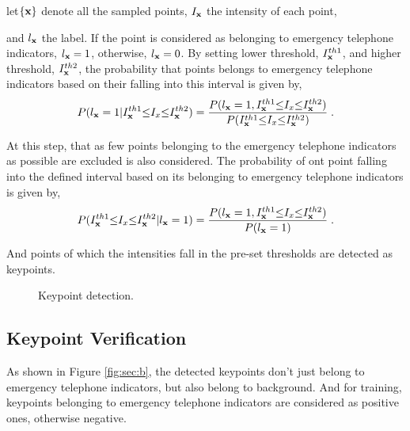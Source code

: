 let$\{\bf{x}\}$ denote all the sampled points, $I_{\bf{x}}$ the intensity of each point, 
and $l_{\bf{x}}$ the label. If the point is considered as belonging to emergency telephone indicators, $l_{\bf{x}}=1$, otherwise, $l_{\bf{x}}=0$. By setting lower threshold, $I^{th1}_{\bf{x}}$,  and higher threshold, $I^{th2}_{\bf{x}}$, the probability that points belongs to emergency telephone indicators based on their falling into this interval is given by,
\begin{equation}
P(l_{\bf{x}}=1|I^{th1}_{\bf{x}}{\leq}I_x{\leq}{I^{th2}_{\bf{x}}})=
\frac
{P(l_{\bf{x}}=1,I^{th1}_{\bf{x}}{\leq}I_x{\leq}{I^{th2}_{\bf{x}}})} {P(I^{th1}_{\bf{x}}{\leq}I_x{\leq}{I^{th2}_{\bf{x}}})}\;.
\label{eq1}
\end{equation}

At this step,  that as few points belonging to the emergency telephone indicators as possible are excluded is also considered. The probability of ont point falling into the defined interval based on its belonging to emergency telephone indicators is given by,
\begin{equation}
P(I^{th1}_{\bf{x}}{\leq}I_x{\leq}{I^{th2}_{\bf{x}}}|l_{\bf{x}}=1)=
\frac
{P(l_{\bf{x}}=1,I^{th1}_{\bf{x}}{\leq}I_x{\leq}{I^{th2}_{\bf{x}}})} {P(l_{\bf{x}}=1)}\;.
\label{eq1.1}
\end{equation}

And points of which the intensities fall in the pre-set thresholds are detected as keypoints.
\begin{figure}
\centering
{}
\caption{Keypoint detection. }
\label{fig:sec}
\end{figure}
\subsection{Keypoint Verification}
As shown in Figure \ref{fig:sec:b}, the detected keypoints don't just belong to emergency telephone indicators, but also belong to background. And for training, keypoints belonging to emergency telephone indicators are considered as positive ones, otherwise negative.

